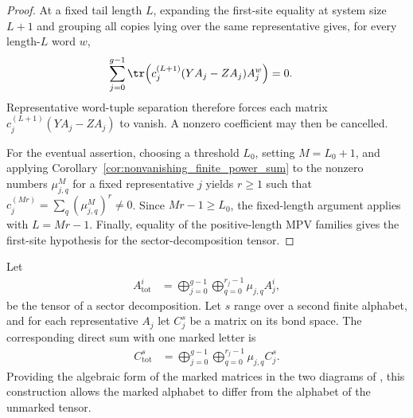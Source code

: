 \begin{proof}
    \leanok
    At a fixed tail length $L$, expanding the first-site equality at system
    size $L+1$ and grouping all copies lying over the same representative
    gives, for every length-$L$ word $w$,
    \begin{align}
        \sum_{j=0}^{g-1}
        \tr\!\left(c_j^{(L+1)}(YA_j-ZA_j)A_j^w\right)
         & =0.
        \notag
    \end{align}
    Representative word-tuple separation therefore forces each matrix
    $c_j^{(L+1)}(YA_j-ZA_j)$ to vanish. A nonzero coefficient may then be
    cancelled.

    For the eventual assertion, choosing a threshold $L_0$, setting
    $M=L_0+1$, and applying Corollary~\ref{cor:nonvanishing_finite_power_sum}
    to the nonzero numbers $\mu_{j,q}^{M}$ for a fixed representative $j$
    yields $r\geq1$ such that
    $c_j^{(Mr)}=\sum_q(\mu_{j,q}^{M})^r\neq0$.
    Since $Mr-1\geq L_0$, the fixed-length argument applies with
    $L=Mr-1$. Finally, equality of the positive-length MPV families gives the
    first-site hypothesis for the sector-decomposition tensor.
\end{proof}

\begin{definition}
    \label{def:marked_representative_direct_sum}
    \leanok
    Let
    \begin{align}
        A_{\mathrm{tot}}^i
         & =\bigoplus_{j=0}^{g-1}\bigoplus_{q=0}^{r_j-1}
        \mu_{j,q}A_j^i,
        \label{eq:mpdo_sector_direct_sum}
    \end{align}
    be the tensor of a sector decomposition. Let $s$ range over a second
    finite alphabet, and for each representative $A_j$ let $C_j^s$ be a
    matrix on its bond space. The corresponding direct sum with one marked
    letter is
    \begin{align}
        C_{\mathrm{tot}}^s
         & =\bigoplus_{j=0}^{g-1}\bigoplus_{q=0}^{r_j-1}
        \mu_{j,q}C_j^s.
        \label{eq:mpdo_marked_direct_sum}
    \end{align}
    Providing the algebraic form of the marked matrices in the two diagrams of
    \cite[Proposition~4.13, lines~1909--1919]{Cirac2016MPDO_arXiv}, this
    construction allows the marked alphabet to differ from the alphabet of the
    unmarked tensor.
\end{definition}

